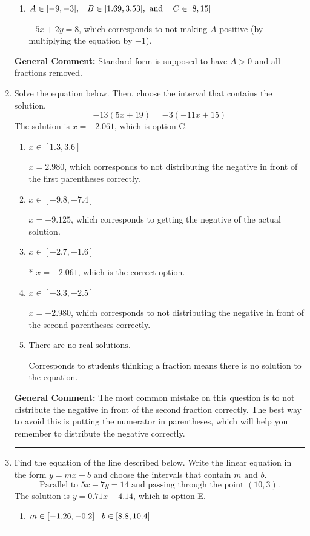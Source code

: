 \documentclass{extbook}[14pt]
\newcommand{\litem}[1]{\item #1

\rule{\textwidth}{0.4pt}}
\begin{document}
\begin{enumerate}
{\begin{enumerate}[label=\Alph*.]
* $5x - 2y = -8$, which is the correct option.
\item \( A \in [-9, -3], \hspace{3mm} B \in [1.69, 3.53], \text{ and } \hspace{3mm} C \in [8, 15] \)

 $-5x + 2y = 8$, which corresponds to not making $A$ positive (by multiplying the equation by $-1$).
\end{enumerate}

\textbf{General Comment:} Standard form is supposed to have $A > 0$ and all fractions removed.
}
\litem{
Solve the equation below. Then, choose the interval that contains the solution.
\[ -13(5x + 19) = -3(-11x + 15) \]The solution is \( x = -2.061 \), which is option C.\begin{enumerate}[label=\Alph*.]
\item \( x \in [1.3, 3.6] \)

$x = 2.980$, which corresponds to not distributing the negative in front of the first parentheses correctly.
\item \( x \in [-9.8, -7.4] \)

$x = -9.125$, which corresponds to getting the negative of the actual solution.
\item \( x \in [-2.7, -1.6] \)

* $x = -2.061$, which is the correct option.
\item \( x \in [-3.3, -2.5] \)

$x = -2.980$, which corresponds to not distributing the negative in front of the second parentheses correctly.
\item \( \text{There are no real solutions.} \)

Corresponds to students thinking a fraction means there is no solution to the equation.
\end{enumerate}

\textbf{General Comment:} The most common mistake on this question is to not distribute the negative in front of the second fraction correctly. The best way to avoid this is putting the numerator in parentheses, which will help you remember to distribute the negative correctly.
}
\litem{
Find the equation of the line described below. Write the linear equation in the form $ y=mx+b $ and choose the intervals that contain $m$ and $b$.
\[ \text{Parallel to } 5 x - 7 y = 14 \text{ and passing through the point } (10, 3). \]The solution is \( y = 0.71x - 4.14 \), which is option E.\begin{enumerate}[label=\Alph*.]
\item \( m \in [-1.26, -0.2] \hspace*{3mm} b \in [8.8, 10.4] \)


\end{enumerate}}
\end{enumerate}
\end{document}
